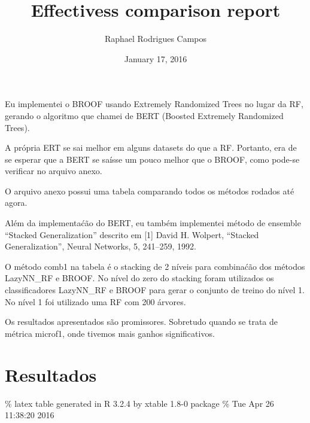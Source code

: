 \documentclass[]{article}
\title{Effectivess comparison report}
\author{Raphael Rodrigues Campos}
\date{January 17, 2016}
\begin{document}
\maketitle


Eu implementei o BROOF usando Extremely Randomized Trees no lugar da RF,
gerando o algoritmo que chamei de BERT (Boosted Extremely Randomized
Trees).

A própria ERT se sai melhor em alguns datasets do que a RF. Portanto,
era de se esperar que a BERT se saísse um pouco melhor que o BROOF, como
pode-se verificar no arquivo anexo.

O arquivo anexo possui uma tabela comparando todos os métodos rodados
até agora.

Além da implementaćão do BERT, eu também implementei método de ensemble
``Stacked Generalization'' descrito em {[}1{]} David H. Wolpert,
``Stacked Generalization'', Neural Networks, 5, 241--259, 1992.

O método comb1 na tabela é o stacking de 2 níveis para combinaćão dos
métodos LazyNN\_RF e BROOF. No nível do zero do stacking foram
utilizados os classificadores LazyNN\_RF e BROOF para gerar o conjunto
de treino do nível 1. No nível 1 foi utilizado uma RF com 200 árvores.

Os resultados apresentados são promissores. Sobretudo quando se trata de
métrica microf1, onde tivemos mais ganhos significativos.

\section{Resultados}\label{resultados}

\% latex table generated in R 3.2.4 by xtable 1.8-0 package \% Tue Apr
26 11:38:20 2016
\end{document}
